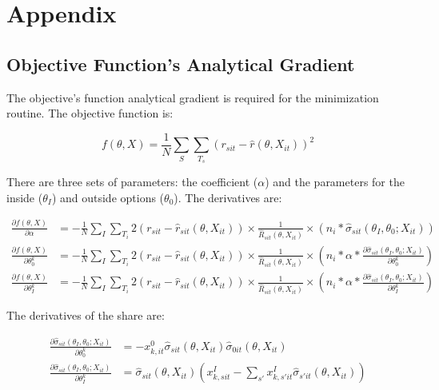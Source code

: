 \documentclass[11.5pt]{article}
\begin{document}



\newpage

\section{Appendix}

\subsection{Objective Function's Analytical Gradient}

The objective's function analytical gradient is required for the minimization routine. The objective function is:

\[f(\theta,X)= \frac{1}{N} \sum_S \sum_{T_s} (r_{sit}-\hat r(\theta,X_{it}))^2\]

There are three sets of parameters: the coefficient ($\alpha$) and the parameters for the inside ($\theta_I$) and outside options ($\theta_0$). The derivatives are:

\begin{align*}
    \frac{\partial f(\theta,X)}{\partial \alpha} &= -\frac{1}{N}\sum_I \sum_{T_i} 2(r_{sit} - \hat r_{sit}(\theta, X_{it})) \times \frac{1}{\hat R_{sit}(\theta,X_{it})}\times (n_i *  \hat \sigma_{sit}(\theta_I, \theta_0; X_{it}))\\
    \frac{\partial f(\theta,X)}{\partial \theta_0^k} & = -\frac{1}{N}\sum_I \sum_{T_i} 2(r_{sit} - \hat r_{sit}(\theta, X_{it}))  \times \frac{1}{\hat R_{sit}(\theta,X_{it})}\times  \left(n_i * \alpha *   \frac{\partial \hat\sigma_{sit}(\theta_I, \theta_0; X_{it})}{\partial \theta_0^k}\right) \\
    \frac{\partial f(\theta,X)}{\partial \theta_I^k} & = -\frac{1}{N}\sum_I \sum_{T_i} 2(r_{sit} - \hat r_{sit}(\theta, X_{it}))  \times \frac{1}{\hat R_{sit}(\theta,X_{it})}\times  \left(n_i * \alpha *   \frac{\partial \hat\sigma_{sit}(\theta_I, \theta_0; X_{it})}{\partial \theta_I^k}\right) 
\end{align*}

The derivatives of the share are:


\begin{align*}
    \frac{\partial \hat\sigma_{sit}(\theta_I, \theta_0; X_{it})}{\partial \theta_0^k} &  = - x^0_{k,it} \hat \sigma_{sit}(\theta,X_{it}) \hat \sigma_{0it}(\theta,X_{it}) \\
    \frac{\partial \hat\sigma_{sit}(\theta_I, \theta_0; X_{it})}{\partial \theta_I^k} & = \hat \sigma_{sit}(\theta, X_{it})  \left(x_{k,sit}^I - \sum_{s'} x_{k,s'it}^I \hat \sigma_{s'it}(\theta, X_{it})\right)
\end{align*}
\end{document}
